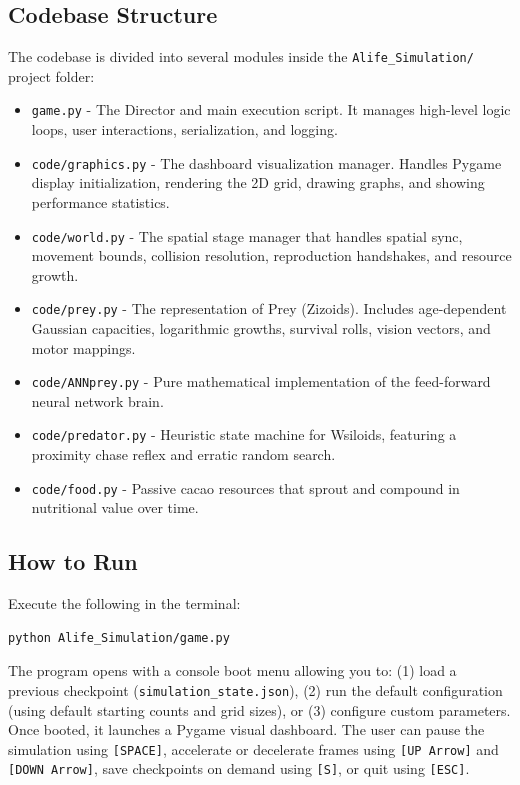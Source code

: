 \documentclass[11pt,a4paper]{article}
\begin{document}
\subsection{Codebase Structure}
The codebase is divided into several modules inside the \texttt{Alife\_Simulation/} project folder:
\begin{itemize}
    \item \texttt{game.py} - The Director and main execution script. It manages high-level logic loops, user interactions, serialization, and logging.
    \item \texttt{code/graphics.py} - The dashboard visualization manager. Handles Pygame display initialization, rendering the 2D grid, drawing graphs, and showing performance statistics.
    \item \texttt{code/world.py} - The spatial stage manager that handles spatial sync, movement bounds, collision resolution, reproduction handshakes, and resource growth.
    \item \texttt{code/prey.py} - The representation of Prey (Zizoids). Includes age-dependent Gaussian capacities, logarithmic growths, survival rolls, vision vectors, and motor mappings.
    \item \texttt{code/ANNprey.py} - Pure mathematical implementation of the feed-forward neural network brain.
    \item \texttt{code/predator.py} - Heuristic state machine for Wsiloids, featuring a proximity chase reflex and erratic random search.
    \item \texttt{code/food.py} - Passive cacao resources that sprout and compound in nutritional value over time.
\end{itemize}

\subsection{How to Run}
Execute the following in the terminal:
\begin{lstlisting}[language=bash]
python Alife_Simulation/game.py
\end{lstlisting}
The program opens with a console boot menu allowing you to: (1) load a previous checkpoint (\texttt{simulation\_state.json}), (2) run the default configuration (using default starting counts and grid sizes), or (3) configure custom parameters. Once booted, it launches a Pygame visual dashboard. The user can pause the simulation using \texttt{[SPACE]}, accelerate or decelerate frames using \texttt{[UP Arrow]} and \texttt{[DOWN Arrow]}, save checkpoints on demand using \texttt{[S]}, or quit using \texttt{[ESC]}.
\end{document}
